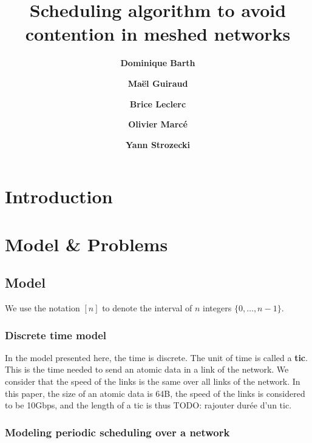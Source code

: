 \documentclass[english]{article}
\begin{document}
\title{Scheduling algorithm to avoid contention in meshed networks}
 

\newcommand{\todo}[1]{{\color{red} TODO: {#1}}}
\newcommand{\spall}{\textsc{SPALL}\xspace}
\newtheorem{theorem}{Theorem}
\newtheorem{lemma}[theorem]{Lemma}
\newtheorem{definition}{Definition}
\newtheorem{corollary}{Corollary}
\author[1]{\bf{ {Dominique Barth}}}
\author[1,2]{\bf{ {Ma\"el Guiraud}}}
\author[2]{\bf{ {Brice Leclerc}}}
\author[2]{\bf{ {Olivier Marc\'e}}}
\author[1]{\bf{ {Yann Strozecki}}}




\maketitle

\section*{Introduction}
\section{Model \& Problems}
\subsection{Model}

We use the notation $[n]$ to denote the interval of $n$ integers $\{0,\dots,n-1\}$.

  \subsubsection{Discrete time model}
  In the model presented here, the time is discrete. The unit of time is called a {\bf tic}. This is the time needed to send an atomic data in a link of the network. We consider that the speed of the links is the same over all links of the network. 
  In this paper, the size of an atomic data is 64B, the speed of the links is considered to be 10Gbps, and the length of a tic is thus 
  \todo{rajouter durée d'un tic}.

  \subsubsection{Modeling periodic scheduling over a network}
\end{document}
